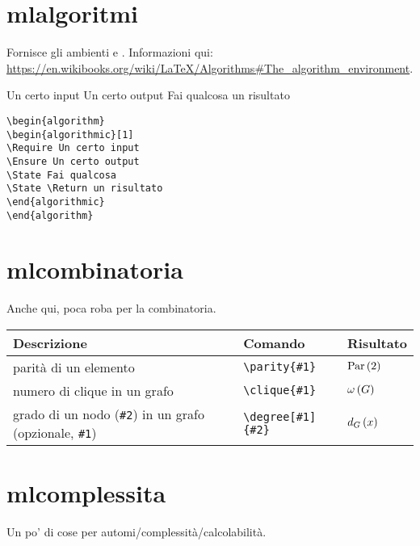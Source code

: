 \documentclass[draft]{article}
\begin{document}
\section{mlalgoritmi}

Fornisce gli ambienti  e .
Informazioni qui: \url{https://en.wikibooks.org/wiki/LaTeX/Algorithms#The_algorithm_environment}.

\begin{algorithm}
\begin{algorithmic}[1]
\Require Un certo input
\Ensure Un certo output
\State Fai qualcosa
\State \Return un risultato
\end{algorithmic}
\end{algorithm}
\begin{verbatim}
\begin{algorithm}
\begin{algorithmic}[1]
\Require Un certo input
\Ensure Un certo output
\State Fai qualcosa
\State \Return un risultato
\end{algorithmic}
\end{algorithm}
\end{verbatim}

\section{mlcombinatoria}

Anche qui, poca roba per la combinatoria.

\begin{tabular}{ | p{7cm} | p{4cm} | p{4cm} | }
	\hline
	Descrizione & Comando & Risultato \\
	\hline
	parit\`a di un elemento & \verb|\parity{#1}| & $\parity{2}$ \\ \hline
	numero di clique in un grafo & \verb|\clique{#1}| & $\clique{G}$ \\ \hline
	grado di un nodo (\verb|#2|) in un grafo (opzionale, \verb|#1|) & \verb|\degree[#1]{#2}| & $\degree[G]{x}$ \\ \hline
\end{tabular}


\section{mlcomplessita}

Un po' di cose per automi/complessit\`a/calcolabilit\`a.
\end{document}
